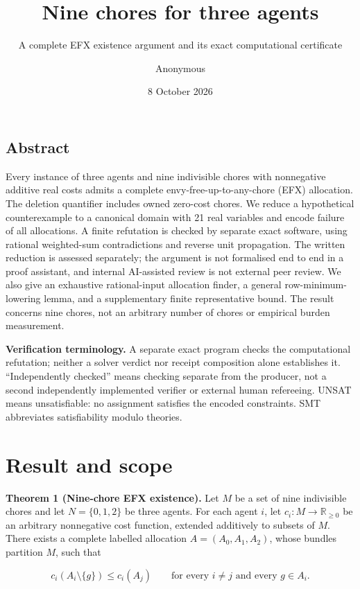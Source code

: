 \documentclass[
  11pt,
]{article}
\title{Nine chores for three agents}
\subtitle{A complete EFX existence argument and its exact computational
certificate}
\author{Anonymous}
\date{8 October 2026}
\begin{document}
\maketitle

\subsection*{Abstract}\label{abstract}

Every instance of three agents and nine indivisible chores with
nonnegative additive real costs admits a complete
envy-free-up-to-any-chore (EFX) allocation. The deletion quantifier
includes owned zero-cost chores. We reduce a hypothetical counterexample
to a canonical domain with 21 real variables and encode failure of all
allocations. A finite refutation is checked by separate exact software,
using rational weighted-sum contradictions and reverse unit propagation.
The written reduction is assessed separately; the argument is not
formalised end to end in a proof assistant, and internal AI-assisted
review is not external peer review. We also give an exhaustive
rational-input allocation finder, a general row-minimum-lowering lemma,
and a supplementary finite representative bound. The result concerns
nine chores, not an arbitrary number of chores or empirical burden
measurement.

\textbf{Verification terminology.} A separate exact program checks the
computational refutation; neither a solver verdict nor receipt
composition alone establishes it. ``Independently checked'' means
checking separate from the producer, not a second independently
implemented verifier or external human refereeing. UNSAT means
unsatisfiable: no assignment satisfies the encoded constraints. SMT
abbreviates satisfiability modulo theories.

\section{Result and scope}\label{result-and-scope}

\textbf{Theorem 1 (Nine-chore EFX existence).} Let \(M\) be a set of
nine indivisible chores and let \(N=\{0,1,2\}\) be three agents. For
each agent \(i\), let \(c_i:M\to\mathbb R_{\ge0}\) be an arbitrary
nonnegative cost function, extended additively to subsets of \(M\).
There exists a complete labelled allocation \(A=(A_0,A_1,A_2)\), whose
bundles partition \(M\), such that

\[
c_i(A_i\setminus\{g\})\le c_i(A_j)
\qquad\text{for every }i\ne j\text{ and every }g\in A_i.
\]
\end{document}
